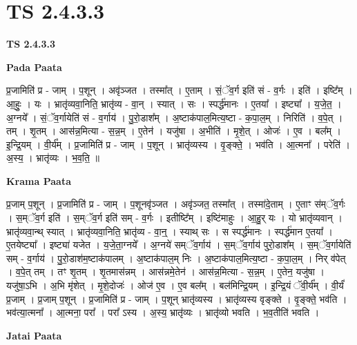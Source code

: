 \documentclass[17pt]{extarticle}
\begin{document}
\section{ TS 2.4.3.3 }

\textbf{TS 2.4.3.3 } \newline

\textbf{Pada Paata} \newline

प्र॒जामिति॑ प्र - जाम् । प॒शून् । अवृ॑ञ्जत । तस्मा᳚त् । ए॒ताम् । सं॒ॅव॒र्ग इति॑ सं - व॒र्गः । इति॑ । इष्टि᳚म् । आ॒हुः॒ । यः । भ्रातृ॑व्यवा॒निति॒ भ्रातृ॑व्य - वा॒न् । स्यात् । सः । स्पर्द्ध॑मानः । ए॒तया᳚ । इष्ट्या᳚ । य॒जे॒त॒ । अ॒ग्नये᳚ । सं॒ॅव॒र्गायेति॑ सं - व॒र्गाय॑ । पु॒रो॒डाश᳚म् । अ॒ष्टाक॑पाल॒मित्य॒ष्टा - क॒पा॒ल॒म् । निरिति॑ । व॒पे॒त् । तम् । शृ॒तम् । आस॑न्न॒मित्या - स॒न्न॒म् । ए॒तेन॑ । यजु॑षा । अ॒भीति॑ । मृ॒शे॒त् । ओजः॑ । ए॒व । बल᳚म् । इ॒न्द्रि॒यम् । वी॒र्य᳚म् । प्र॒जामिति॑ प्र - जाम् । प॒शून् । भ्रातृ॑व्यस्य । वृ॒ङ्क्ते॒ । भव॑ति । आ॒त्मना᳚ । परेति॑ । अ॒स्य॒ । भ्रातृ॑व्यः । भ॒व॒ति॒ ॥  \newline


\textbf{Krama Paata} \newline

प्र॒जाम् प॒शून् । प्र॒जामिति॑ प्र - जाम् । प॒शूनवृ॑ञ्जत । अवृ॑ञ्जत॒ तस्मा᳚त् । तस्मा॑दे॒ताम् । ए॒ताꣳ स॑म्ॅव॒र्गः । स॒म्ॅव॒र्ग इति॑ । स॒म्ॅव॒र्ग इति॑ सम् - व॒र्गः । इतीष्टि᳚म् । इष्टि॑माहुः । आ॒हु॒र् यः । यो भ्रातृ॑व्यवान् । भ्रातृ॑व्यवा॒न्थ् स्यात् । भ्रातृ॑व्यवा॒निति॒ भ्रातृ॑व्य - वा॒न्॒ । स्याथ् सः । स स्पर्द्ध॑मानः । स्पर्द्ध॑मान ए॒तया᳚ । ए॒तयेष्ट्या᳚ । इष्ट्या॑ यजेत । य॒जे॒ता॒ग्नये᳚ । अ॒ग्नये॑ सम्ॅव॒र्गाय॑ । स॒म्ॅव॒र्गाय॑ पुरो॒डाश᳚म् । स॒म्ॅव॒र्गायेति॑ सम् - व॒र्गाय॑ । पु॒रो॒डाश॑म॒ष्टाक॑पालम् । अ॒ष्टाक॑पाल॒म् निः । अ॒ष्टाक॑पाल॒मित्य॒ष्टा - क॒पा॒ल॒म् । निर् व॑पेत् । व॒पे॒त् तम् । तꣳ शृ॒तम् । शृ॒तमास॑न्नम् । आस॑न्नमे॒तेन॑ । आस॑न्न॒मित्या - स॒न्न॒म् । ए॒तेन॒ यजु॑षा । यजु॑षा॒ऽभि । अ॒भि मृ॑शेत् । मृ॒शे॒दोजः॑ । ओज॑ ए॒व । ए॒व बल᳚म् । बल॑मिन्द्रि॒यम् । इ॒न्द्रि॒यं ॅवी॒र्य᳚म् । वी॒र्यं॑ प्र॒जाम् । प्र॒जाम् प॒शून् । प्र॒जामिति॑ प्र - जाम् । प॒शून् भ्रातृ॑व्यस्य । भ्रातृ॑व्यस्य वृङ्क्ते । वृ॒ङ्क्ते॒ भव॑ति । भव॑त्या॒त्मना᳚ । आ॒त्मना॒ परा᳚ । परा᳚ ऽस्य । अ॒स्य॒ भ्रातृ॑व्यः । भ्रातृ॑व्यो भवति । भ॒व॒तीति॑ भवति । \newline

\textbf{Jatai Paata} \newline
\end{document}

